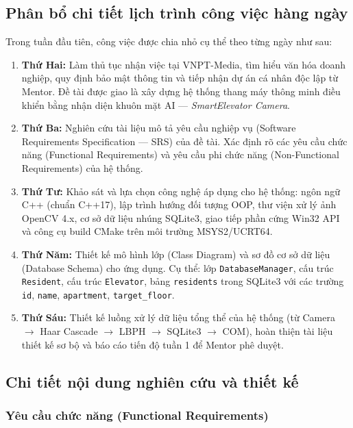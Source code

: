 \documentclass[12pt,a4paper]{article}
\begin{document}
\subsection{Phân bổ chi tiết lịch trình công việc hàng ngày}

Trong tuần đầu tiên, công việc được chia nhỏ cụ thể theo từng ngày như sau:

\begin{enumerate}
    \item \textbf{Thứ Hai:} Làm thủ tục nhận việc tại VNPT-Media, tìm hiểu văn hóa doanh nghiệp, quy định bảo mật thông tin và tiếp nhận dự án cá nhân độc lập từ Mentor. Đề tài được giao là xây dựng hệ thống thang máy thông minh điều khiển bằng nhận diện khuôn mặt AI --- \textit{SmartElevator Camera}.

    \item \textbf{Thứ Ba:} Nghiên cứu tài liệu mô tả yêu cầu nghiệp vụ (Software Requirements Specification --- SRS) của đề tài. Xác định rõ các yêu cầu chức năng (Functional Requirements) và yêu cầu phi chức năng (Non-Functional Requirements) của hệ thống.

    \item \textbf{Thứ Tư:} Khảo sát và lựa chọn công nghệ áp dụng cho hệ thống: ngôn ngữ C++ (chuẩn C++17), lập trình hướng đối tượng OOP, thư viện xử lý ảnh OpenCV 4.x, cơ sở dữ liệu nhúng SQLite3, giao tiếp phần cứng Win32 API và công cụ build CMake trên môi trường MSYS2/UCRT64.

    \item \textbf{Thứ Năm:} Thiết kế mô hình lớp (Class Diagram) và sơ đồ cơ sở dữ liệu (Database Schema) cho ứng dụng. Cụ thể: lớp \texttt{DatabaseManager}, cấu trúc \texttt{Resident}, cấu trúc \texttt{Elevator}, bảng \texttt{residents} trong SQLite3 với các trường \texttt{id}, \texttt{name}, \texttt{apartment}, \texttt{target\_floor}.

    \item \textbf{Thứ Sáu:} Thiết kế luồng xử lý dữ liệu tổng thể của hệ thống (từ Camera $\rightarrow$ Haar Cascade $\rightarrow$ LBPH $\rightarrow$ SQLite3 $\rightarrow$ COM), hoàn thiện tài liệu thiết kế sơ bộ và báo cáo tiến độ tuần 1 để Mentor phê duyệt.
\end{enumerate}

\subsection{Chi tiết nội dung nghiên cứu và thiết kế}

\subsubsection{Yêu cầu chức năng (Functional Requirements)}
\end{document}
